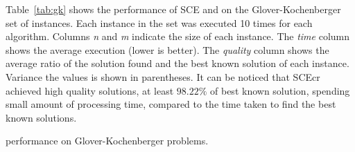 Table~\ref{tab:gk} shows the performance of SCE and \scecore on the Glover-Kochenberger set of instances.
Each instance in the set was executed 10 times for each algorithm.
Columns \textit{n} and \textit{m} indicate the size of each instance.
The \textit{time} column shows the average execution (lower is better).
The \textit{quality} column shows the average ratio of the solution found and
the best known solution of each instance.
Variance the values is shown in parentheses.
It can be noticed that SCEcr achieved high quality solutions, at least $98.22\%$
of best known solution, spending small amount of processing time, compared
to the time taken to find the best known solutions.

\begin{table}
 \caption{\scecore performance on Glover-Kochenberger problems.}
{
\renewcommand{\arraystretch}{1.5}%
\fontsize{7.3pt}{1em}\selectfont 
\begin{center}
\end{center}
  
}
 \label{tab:gk}
\end{table}

